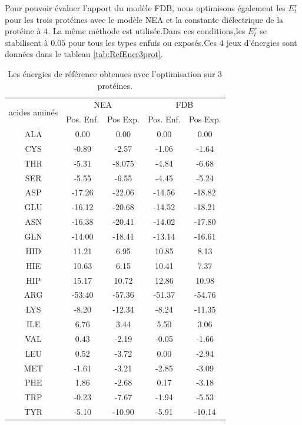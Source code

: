 Pour pouvoir évaluer l'apport du modèle FDB, nous optimisons également les $E_t^r$ pour les trois protéines avec le modèle NEA et la constante diélectrique de la protéine à $4$. La même méthode est utilisée.Dans ces conditions,les $E_t^r$ se stabilisent à $0.05$ pour tous les types enfuis ou exposés.Ces 4 jeux d'énergies sont données dans le tableau \ref{tab:RefEner3prot}. 


    \begin{table}[!htbp]
      \centering
      \caption{Les énergies de référence obtenues avec l'optimisation sur 3 protéines.}
      \begin{tabular}{ccc|cc}

        \toprule
        \multirow{2}{*}{acides aminés}  & \multicolumn{2}{c|}{NEA} & \multicolumn{2}{c}{FDB} \\
        \cmidrule{2-5}
         & Pos. Enf. & Pos Exp. & Pos. Enf. & Pos Exp. \\
        \cmidrule{1-5}

        ALA &   0.00     &  0.00    &   0.00  &   0.00       \\
        CYS &  -0.89     &  -2.57   &  -1.06  &   -1.64      \\
        THR &  -5.31     &  -8.075  &  -4.84  &   -6.68      \\
        SER &  -5.55     &  -6.55   &  -4.45  &   -5.24      \\
        ASP &  -17.26    &  -22.06  &  -14.56 &   -18.82     \\
        GLU &  -16.12    &  -20.68  &  -14.52 &   -18.21     \\
        ASN &  -16.38    &  -20.41  &  -14.02 &   -17.80     \\
        GLN &  -14.00    &  -18.41  &  -13.14 &   -16.61     \\
        HID &   11.21    &  6.95    &  10.85  &   8.13       \\
        HIE &   10.63    &  6.15    &  10.41  &   7.37       \\
        HIP &   15.17    &  10.72   &  12.86  &   10.98      \\
        ARG &  -53.40    &  -57.36  &  -51.37 &   -54.76     \\
        LYS &  -8.20     &  -12.34  &  -8.24  &   -11.35     \\
        ILE &   6.76     &  3.44    &  5.50   &   3.06       \\
        VAL &   0.43     &  -2.19   &  -0.05  &   -1.66      \\
        LEU &   0.52     &  -3.72   &  0.00   &   -2.94      \\
        MET &  -1.61     &  -3.21   &  -2.85  &   -3.09      \\
        PHE &   1.86     &  -2.68   &  0.17   &   -3.18      \\
        TRP &  -0.23     &  -7.67   &  -1.94  &   -5.53      \\
        TYR &  -5.10     &  -10.90  &  -5.91  &   -10.14     \\


\end{tabular}
\end{table}
